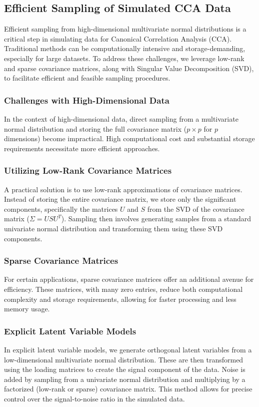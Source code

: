 \subsection{Efficient Sampling of Simulated CCA Data}

Efficient sampling from high-dimensional multivariate normal distributions is a critical step in simulating data for Canonical Correlation Analysis (CCA). Traditional methods can be computationally intensive and storage-demanding, especially for large datasets. To address these challenges, we leverage low-rank and sparse covariance matrices, along with Singular Value Decomposition (SVD), to facilitate efficient and feasible sampling procedures.

\subsubsection{Challenges with High-Dimensional Data}
In the context of high-dimensional data, direct sampling from a multivariate normal distribution and storing the full covariance matrix (\(p \times p\) for \(p\) dimensions) become impractical.
High computational cost and substantial storage requirements necessitate more efficient approaches.

\subsubsection{Utilizing Low-Rank Covariance Matrices}
A practical solution is to use low-rank approximations of covariance matrices. Instead of storing the entire covariance matrix, we store only the significant components, specifically the matrices \(U\) and \(S\) from the SVD of the covariance matrix (\(\Sigma = U S U^T\)). Sampling then involves generating samples from a standard univariate normal distribution and transforming them using these SVD components.

\subsubsection{Sparse Covariance Matrices}
For certain applications, sparse covariance matrices offer an additional avenue for efficiency.
These matrices, with many zero entries, reduce both computational complexity and storage requirements, allowing for faster processing and less memory usage.

\subsubsection{Explicit Latent Variable Models}
In explicit latent variable models, we generate orthogonal latent variables from a low-dimensional multivariate normal distribution.
These are then transformed using the loading matrices to create the signal component of the data. Noise is added by sampling from a univariate normal distribution and multiplying by a factorized (low-rank or sparse) covariance matrix.
This method allows for precise control over the signal-to-noise ratio in the simulated data.

